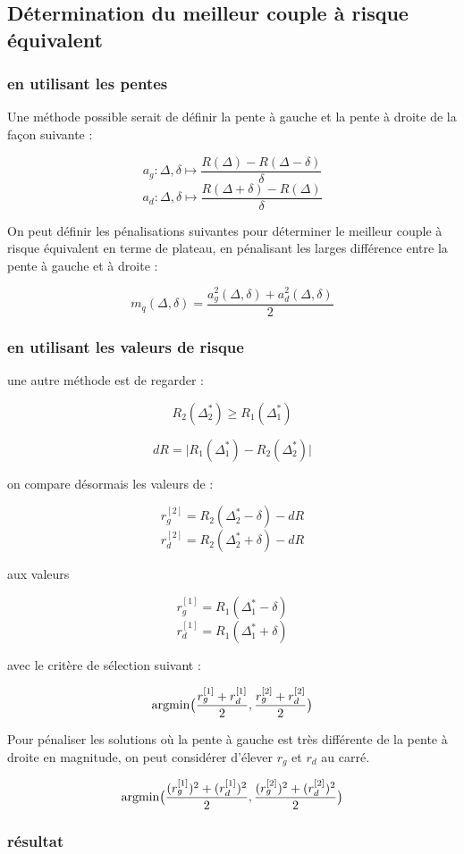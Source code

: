\subsection{Détermination du meilleur couple à risque \og équivalent \fg}

\subsubsection{en utilisant les pentes}


Une méthode possible serait de définir la pente à gauche et la pente à droite de la façon suivante : 

$$a_g : \Delta, \delta \mapsto \frac{R(\Delta) - R(\Delta - \delta)}{\delta}$$
$$a_d : \Delta, \delta \mapsto \frac{R(\Delta + \delta) - R(\Delta)}{\delta}$$

On peut définir les pénalisations suivantes pour déterminer le meilleur couple à risque équivalent en terme de plateau, en pénalisant les larges différence entre la pente à gauche et à droite :

$$m_q(\Delta, \delta) = \frac{a_g^2(\Delta, \delta) + a_d^2(\Delta, \delta)}{2}$$


\subsubsection{en utilisant les valeurs de risque}
une autre méthode est de regarder :

$$R_2(\Delta^*_2) \geq R_1(\Delta^*_1)$$

$$dR = \bigl\vert R_1(\Delta^*_1) - R_2(\Delta^*_2) \bigr\vert$$

on compare désormais les valeurs de :

$$r_g^{[2]} = R_2(\Delta^*_2 - \delta) - dR$$ 
$$r_d^{[2]} = R_2(\Delta^*_2 + \delta) - dR$$ 

aux valeurs

$$r_g^{[1]} = R_1(\Delta^*_1 - \delta)$$ 
$$r_d^{[1]} = R_1(\Delta^*_1 + \delta)$$

avec le critère de sélection suivant :

$$\argmin \bigl( \frac{r_g^{[1]} + r_d^{[1]}}{2}, \frac{r_g^{[2]} + r_d^{[2]}}{2}  \bigr)$$

Pour pénaliser les solutions où la pente à gauche est très différente de la pente à droite en magnitude, on peut considérer d'élever $r_g$ et $r_d$ au carré.

$$\argmin \bigl( \frac{(r_g^{[1]})^2 + (r_d^{[1]})^2}{2}, \frac{(r_g^{[2]})^2 + (r_d^{[2]})^2}{2}  \bigr)$$

\subsubsection{résultat}